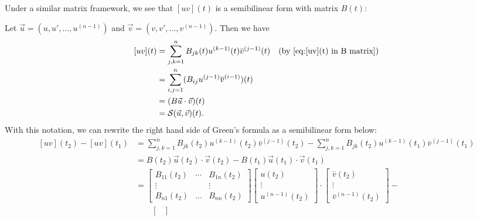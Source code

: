 \documentclass[10.5pt, oneside, a4paper]{article}
\begin{document}
\begin{rmk}
    Under a similar matrix framework, we see that $[uv](t)$ is a semibilinear form with matrix $B(t)$:

    {\color{blue}
    Let $\vec{u}=(u, u', \ldots, u^{(n-1)})$ and $\vec{v}=(v, v', \ldots, v^{(n-1)})$. Then we have
    \begin{equation}\label{[uv](t) in semibilinear form}
        \begin{split}
        [uv](t) &= \sum_{j,k=1}^n B_{jk}(t)u^{(k-1)}(t)\bar{v}^{(j-1)}(t)\quad\mbox{(by \eqref{eq:[uv](t) in B matrix})}\\
        &= \sum_{i,j=1}^n (B_{ij}u^{(j-1)}\overline{v}^{(i-1)})(t)\\
        &= (B\vec{u}\cdot \vec{v})(t)\\
        &= \mathcal{S}(\vec{u},\vec{v})(t).
        \end{split}
    \end{equation}
    With this notation, we can rewrite the right hand side of Green's formula as a semibilinear form below:
    \begin{equation}\label{eq:green's formula in semibilinear form}
        \begin{split}
        [uv](t_2)-[uv](t_1) &= \sum_{j,k=1}^n B_{jk}(t_2)u^{(k-1)}(t_2)\bar{v}^{(j-1)}(t_2) - \sum_{j,k=1}^n B_{jk}(t_2)u^{(k-1)}(t_1)\bar{v}^{(j-1)}(t_1)\\
        &= B(t_2)\vec{u}(t_2)\cdot \vec{v}(t_2) - B(t_1)\vec{u}(t_1)\cdot \vec{v}(t_1)\\
        &= \begin{bmatrix}
            B_{11}(t_2) & \cdots & B_{1n}(t_2)\\
            \vdots &  & \vdots\\
            B_{n1}(t_2) & \ldots & B_{nn}(t_2)
        \end{bmatrix} 
        \begin{bmatrix}
        u(t_2)\\
        \vdots\\
        u^{(n-1)}(t_2)
        \end{bmatrix}\cdot 
        \begin{bmatrix}
            \bar{v}(t_2)\\
            \vdots\\
            \bar{v}^{(n-1)}(t_2)
        \end{bmatrix} -\\
        &\qquad \begin{bmatrix}

\end{bmatrix}
\end{split}
\end{equation}}
\end{rmk}
\end{document}

